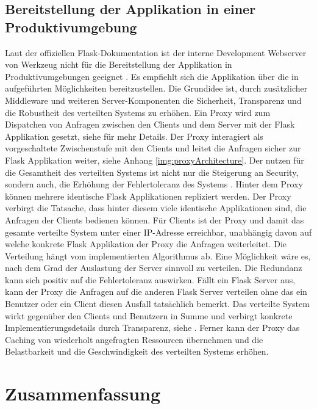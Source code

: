 \documentclass[a4paper,titlepage,halfparskip,12pt,listof=numbered]{scrreprt}
\begin{document}
\begin{onehalfspacing}
\section{Bereitstellung der Applikation in einer Produktivumgebung}
\label{sec:ProductiveDeployment}

Laut der offiziellen Flask-Dokumentation ist der interne Development Webserver von Werkzeug nicht für die Bereitstellung der Applikation in Produktivumgebungen geeignet \cite{flaskAppDeployment}. Es empfiehlt sich die Applikation über die in \cite{flaskAppDeployment} aufgeführten Möglichkeiten bereitzustellen. Die Grundidee ist, durch zusätzlicher Middleware und weiteren Server-Komponenten die Sicherheit, Transparenz und die Robustheit des verteilten Systems zu erhöhen. Ein Proxy wird zum Dispatchen von Anfragen zwischen den Clients und dem Server mit der Flask Applikation gesetzt, siehe \cite[S.612ff.]{andrew2008verteilte} für mehr Details. Der Proxy interagiert als vorgeschaltete Zwischenstufe mit den Clients und leitet die Anfragen sicher zur Flask Applikation weiter, siehe Anhang \autoref{img:proxyArchitecture}. Der nutzen für die Gesamtheit des verteilten Systems ist nicht nur die Steigerung an Security, sondern auch, die Erhöhung der Fehlertoleranz des Systems \cite[S.20ff.]{richterArchitekturVS}. Hinter dem Proxy können mehrere identische Flask Applikationen repliziert werden. Der Proxy verbirgt die Tatsache, dass hinter diesem viele identische Applikationen sind, die Anfragen der Clients bedienen können. Für Clients ist der Proxy und damit das gesamte verteilte System unter einer IP-Adresse erreichbar, unabhängig davon auf welche konkrete Flask Applikation der Proxy die Anfragen weiterleitet. Die Verteilung hängt vom implementierten Algorithmus ab. Eine Möglichkeit wäre es, nach dem Grad der Auslastung der Server sinnvoll zu verteilen. Die Redundanz kann sich positiv auf die Fehlertoleranz auswirken. Fällt ein Flask Server aus, kann der Proxy die Anfragen auf die anderen Flask Server verteilen ohne das ein Benutzer oder ein Client diesen Ausfall tatsächlich bemerkt. Das verteilte System wirkt gegenüber den Clients und Benutzern in Summe und verbirgt konkrete Implementierungsdetails durch Transparenz, siehe \cite[S.21ff.]{andrew2008verteilte}. Ferner kann der Proxy das Caching von wiederholt angefragten Ressourcen übernehmen und die Belastbarkeit und die Geschwindigkeit des verteilten Systems erhöhen.\cite[S.20ff.]{richterArchitekturVS}

\chapter{Zusammenfassung}
\label{chap:Zusammenfassung}


\end{onehalfspacing}
\end{document}
